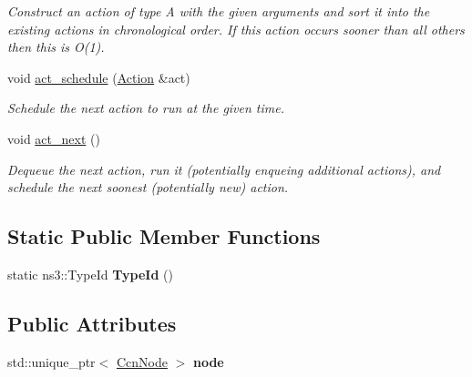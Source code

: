\begin{DoxyCompactItemize}
\begin{DoxyCompactList}\small\item\em Construct an action of type A with the given arguments and sort it into the existing actions in chronological order. If this action occurs sooner than all others then this is O(1). \end{DoxyCompactList}\item 
\hypertarget{classsma_1_1Ns3NodeContainer_adc0a677c70d532797182a36ebfceb13f}{void \hyperlink{classsma_1_1Ns3NodeContainer_adc0a677c70d532797182a36ebfceb13f}{act\-\_\-schedule} (\hyperlink{structsma_1_1Action}{Action} \&act)}\label{classsma_1_1Ns3NodeContainer_adc0a677c70d532797182a36ebfceb13f}

\begin{DoxyCompactList}\small\item\em Schedule the next action to run at the given time. \end{DoxyCompactList}\item 
\hypertarget{classsma_1_1Ns3NodeContainer_af2e85bc06c3ce1e4704b83e75238eb2c}{void \hyperlink{classsma_1_1Ns3NodeContainer_af2e85bc06c3ce1e4704b83e75238eb2c}{act\-\_\-next} ()}\label{classsma_1_1Ns3NodeContainer_af2e85bc06c3ce1e4704b83e75238eb2c}

\begin{DoxyCompactList}\small\item\em Dequeue the next action, run it (potentially enqueing additional actions), and schedule the next soonest (potentially new) action. \end{DoxyCompactList}\end{DoxyCompactItemize}
\subsection*{Static Public Member Functions}
\begin{DoxyCompactItemize}
\item 
\hypertarget{classsma_1_1Ns3NodeContainer_a5b5b1fecf2f2ef358b6f10fc39f21455}{static ns3\-::\-Type\-Id {\bfseries Type\-Id} ()}\label{classsma_1_1Ns3NodeContainer_a5b5b1fecf2f2ef358b6f10fc39f21455}

\end{DoxyCompactItemize}
\subsection*{Public Attributes}
\begin{DoxyCompactItemize}
\item 
\hypertarget{classsma_1_1Ns3NodeContainer_a20aa2dad2564577082af144530eec729}{std\-::unique\-\_\-ptr$<$ \hyperlink{classsma_1_1CcnNode}{Ccn\-Node} $>$ {\bfseries node}}\label{classsma_1_1Ns3NodeContainer_a20aa2dad2564577082af144530eec729}

\end{DoxyCompactItemize}
